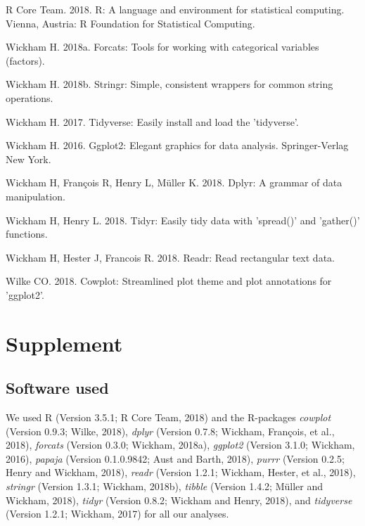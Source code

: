 \documentclass[man,floatsintext]{apa6}
\begin{document}
\leavevmode\hypertarget{ref-R-base}{}%
R Core Team. 2018. R: A language and environment for statistical
computing. Vienna, Austria: R Foundation for Statistical Computing.

\leavevmode\hypertarget{ref-R-forcats}{}%
Wickham H. 2018a. Forcats: Tools for working with categorical variables
(factors).

\leavevmode\hypertarget{ref-R-stringr}{}%
Wickham H. 2018b. Stringr: Simple, consistent wrappers for common string
operations.

\leavevmode\hypertarget{ref-R-tidyverse}{}%
Wickham H. 2017. Tidyverse: Easily install and load the 'tidyverse'.

\leavevmode\hypertarget{ref-R-ggplot2}{}%
Wickham H. 2016. Ggplot2: Elegant graphics for data analysis.
Springer-Verlag New York.

\leavevmode\hypertarget{ref-R-dplyr}{}%
Wickham H, François R, Henry L, Müller K. 2018. Dplyr: A grammar of data
manipulation.

\leavevmode\hypertarget{ref-R-tidyr}{}%
Wickham H, Henry L. 2018. Tidyr: Easily tidy data with 'spread()' and
'gather()' functions.

\leavevmode\hypertarget{ref-R-readr}{}%
Wickham H, Hester J, Francois R. 2018. Readr: Read rectangular text
data.

\leavevmode\hypertarget{ref-R-cowplot}{}%
Wilke CO. 2018. Cowplot: Streamlined plot theme and plot annotations for
'ggplot2'.

\endgroup

\newpage
\setcounter{table}{0}  \renewcommand{\thetable}{S\arabic{table}} \setcounter{figure}{0} \renewcommand{\thefigure}{S\arabic{figure}}

\hypertarget{supplement}{%
\section{Supplement}\label{supplement}}

\hypertarget{software-used}{%
\subsection{Software used}\label{software-used}}

We used R (Version 3.5.1; R Core Team, 2018) and the R-packages
\emph{cowplot} (Version 0.9.3; Wilke, 2018), \emph{dplyr} (Version
0.7.8; Wickham, François, et al., 2018), \emph{forcats} (Version 0.3.0;
Wickham, 2018a), \emph{ggplot2} (Version 3.1.0; Wickham, 2016),
\emph{papaja} (Version 0.1.0.9842; Aust and Barth, 2018), \emph{purrr}
(Version 0.2.5; Henry and Wickham, 2018), \emph{readr} (Version 1.2.1;
Wickham, Hester, et al., 2018), \emph{stringr} (Version 1.3.1; Wickham,
2018b), \emph{tibble} (Version 1.4.2; Müller and Wickham, 2018),
\emph{tidyr} (Version 0.8.2; Wickham and Henry, 2018), and
\emph{tidyverse} (Version 1.2.1; Wickham, 2017) for all our analyses.
\end{document}

